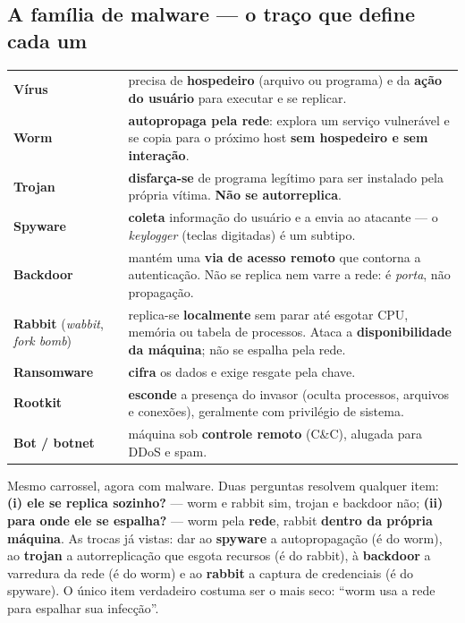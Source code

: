 \subsection{A família de malware --- o traço que define cada um}

\begin{center}
\begin{tabular}{@{}p{2.4cm}p{9.6cm}@{}}
\toprule
\textbf{Vírus} & precisa de \textbf{hospedeiro} (arquivo ou programa) e da
\textbf{ação do usuário} para executar e se replicar. \\
\textbf{Worm} & \textbf{autopropaga pela rede}: explora um serviço
vulnerável e se copia para o próximo host \textbf{sem hospedeiro e sem
interação}. \\
\textbf{Trojan} & \textbf{disfarça-se} de programa legítimo para ser
instalado pela própria vítima. \textbf{Não se autorreplica}. \\
\textbf{Spyware} & \textbf{coleta} informação do usuário e a envia ao
atacante --- o \emph{keylogger} (teclas digitadas) é um subtipo. \\
\textbf{Backdoor} & mantém uma \textbf{via de acesso remoto} que contorna a
autenticação. Não se replica nem varre a rede: é \emph{porta}, não
propagação. \\
\textbf{Rabbit} \newline (\emph{wabbit}, \emph{fork bomb}) & replica-se
\textbf{localmente} sem parar até esgotar CPU, memória ou tabela de
processos. Ataca a \textbf{disponibilidade da máquina}; não se espalha pela
rede. \\
\textbf{Ransomware} & \textbf{cifra} os dados e exige resgate pela chave. \\
\textbf{Rootkit} & \textbf{esconde} a presença do invasor (oculta processos,
arquivos e conexões), geralmente com privilégio de sistema. \\
\textbf{Bot / botnet} & máquina sob \textbf{controle remoto} (C\&C), alugada
para DDoS e spam. \\
\bottomrule
\end{tabular}
\end{center}

\begin{pegadinha}
Mesmo carrossel, agora com malware. Duas perguntas resolvem qualquer item:
\textbf{(i) ele se replica sozinho?} --- worm e rabbit sim, trojan e backdoor
não; \textbf{(ii) para onde ele se espalha?} --- worm pela \textbf{rede},
rabbit \textbf{dentro da própria máquina}. As trocas já vistas: dar ao
\textbf{spyware} a autopropagação (é do worm), ao \textbf{trojan} a
autorreplicação que esgota recursos (é do rabbit), à \textbf{backdoor} a
varredura da rede (é do worm) e ao \textbf{rabbit} a captura de credenciais
(é do spyware). O único item verdadeiro costuma ser o mais seco: ``worm usa
a rede para espalhar sua infecção''.
\end{pegadinha}

